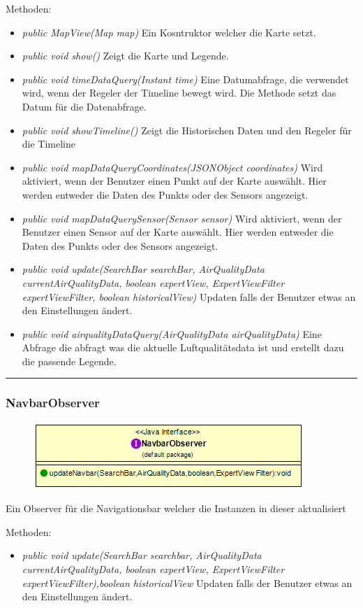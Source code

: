 Methoden: \begin{itemize} [noitemsep]
    \item \emph{public MapView(Map map)} Ein Kosntruktor welcher die Karte setzt.
    \item \emph{public void show()} Zeigt die Karte und Legende.
    \item \emph{public void timeDataQuery(Instant time)} Eine Datumabfrage, die verwendet wird, wenn der Regeler der Timeline bewegt wird. Die Methode setzt das Datum für die Datenabfrage.
    \item \emph{public void showTimeline()} Zeigt die Historischen Daten und den Regeler für die Timeline
    \item \emph{public void mapDataQueryCoordinates(JSONObject coordinates)} Wird aktiviert, wenn der Benutzer einen Punkt auf der Karte auswählt. Hier werden entweder die Daten des Punkts oder des Sensors angezeigt.
    \item \emph{public void mapDataQuerySensor(Sensor sensor)} Wird aktiviert, wenn der Benutzer einen Sensor auf der Karte auswählt. Hier werden entweder die Daten des Punkts oder des Sensors angezeigt.
    \item \emph{public void update(SearchBar searchBar, AirQualityData currentAirQualityData,
    boolean expertView, ExpertViewFilter expertViewFilter, boolean historicalView)} Updaten falls der Benutzer etwas an den Einstellungen ändert.
    \item \emph{public void airqualityDataQuery(AirQualityData airQualityData)} Eine Abfrage die abfragt was die aktuelle Luftqualitätsdata ist und erstellt dazu die passende Legende. 
\end{itemize} 

\rule{\textwidth}{0.4pt}
\subsubsection{NavbarObserver}
\begin{minipage}{0.4\textwidth}
    \begin{figure}[H]
        {\centering\includegraphics[scale = 0.5
        ]{media/view/view/NavbarObserver_Class.png}}
    \end{figure}
    \end{minipage} \hfill
    \begin{minipage}{0.5\textwidth}
Ein Observer für die Navigationsbar welcher die Instanzen in dieser aktualisiert
\end{minipage}
Methoden: \begin{itemize} [noitemsep]
    \item \emph{public void update(SearchBar searchbar, AirQualityData currentAirQualityData,
    boolean expertView, ExpertViewFilter expertViewFilter),boolean historicalView} Updaten falls der Benutzer etwas an den Einstellungen ändert.
\end{itemize}

